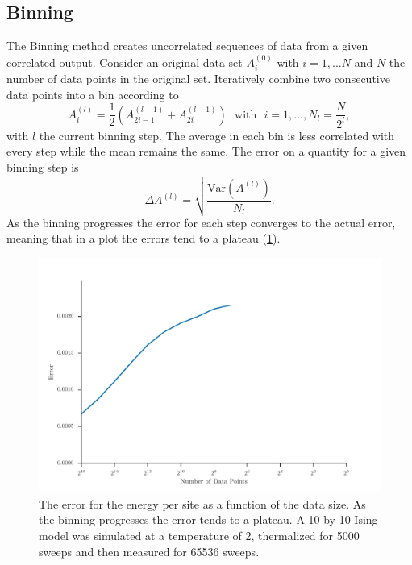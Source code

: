 \documentclass[11pt, a4paper]{report} %
\begin{document}
\subsection{Binning}

The Binning method creates uncorrelated sequences of data from a given correlated output.
Consider an original data set \(A_i^{(0)}\) with \(i = 1, \ldots N\) and \(N\) the number of data points in the original set.
Iteratively combine two consecutive data points into a bin according to
\begin{equation}
	A_i^(l) = \frac{1}{2} \left(A_{2i-1}^{(l-1)} + A_{2i}^{(l-1)} \right) \mathrm{\ \ \ with \ \ \ } i = 1, \ldots, N_l = \frac{N}{2^l},
\end{equation}
with \(l\) the current binning step.
The average in each bin is less correlated with every step while the mean remains the same.
The error on a quantity for a given binning step is
\begin{equation}
	\Delta A^{(l)} = \sqrt{\frac{\mathrm{Var}(A^{(l)})}{N_l}}.
\end{equation}
As the binning progresses the error for each step converges to the actual error, meaning that in a plot the errors tend to a plateau (\cref{fig:binning_error_convergence}).\cite{corboz}
\begin{figure}[h]
	\centering
	\includegraphics[width=\textwidth]{ising_metropolis_energy_per_site_error_binning.pdf}
	\caption{The error for the energy per site as a function of the data size. As the binning progresses the error tends to a plateau. A 10 by 10 Ising model was simulated at a temperature of 2, thermalized for 5000 sweeps and then measured for 65536 sweeps.}
	\label{fig:binning_error_convergence}
\end{figure}
\end{document}
